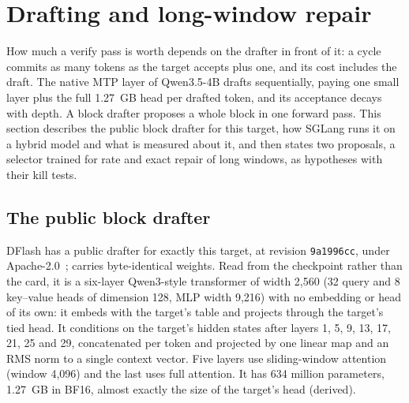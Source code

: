 \section{Drafting and long-window repair}\label{sec:drafting}
How much a verify pass is worth depends on the drafter in front of it: a cycle commits as many tokens as the target accepts plus one, and its cost includes the draft. The native MTP layer of Qwen3.5-4B drafts sequentially, paying one small layer plus the full 1.27~GB head per drafted token, and its acceptance decays with depth. A block drafter proposes a whole block in one forward pass. This section describes the public block drafter for this target, how SGLang runs it on a hybrid model and what is measured about it, and then states two proposals, a selector trained for rate and exact repair of long windows, as hypotheses with their kill tests.

\subsection{The public block drafter}\label{sec:drafter-model}
DFlash has a public drafter for exactly this target,  at revision \texttt{9a1996cc}, under Apache-2.0~\cite{dflashpaper,dflash4bcard};  carries byte-identical weights. Read from the checkpoint rather than the card, it is a six-layer Qwen3-style transformer of width 2,560 (32 query and 8 key--value heads of dimension 128, MLP width 9,216) with no embedding or head of its own: it embeds with the target's table and projects through the target's tied head. It conditions on the target's hidden states after layers 1, 5, 9, 13, 17, 21, 25 and 29, concatenated per token and projected by one linear map and an RMS norm to a single context vector. Five layers use sliding-window attention (window 4,096) and the last uses full attention. It has 634 million parameters, 1.27~GB in BF16, almost exactly the size of the target's head (derived).

